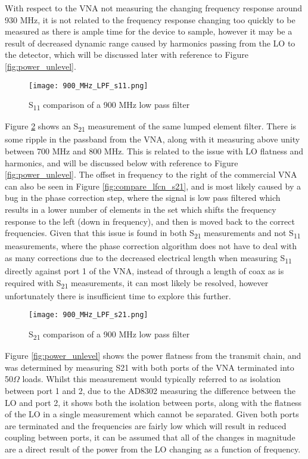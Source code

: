 With respect to the VNA not measuring the changing frequency response around 930 MHz, it is not related to the frequency response changing too quickly to be measured as there is ample time for the device to sample, however it may be a result of decreased dynamic range caused by harmonics passing from the LO to the detector, which will be discussed later with reference to Figure \ref{fig:power_unlevel}. 
\begin{figure}[H]
	\centering
	\texttt{[image: 900\_MHz\_LPF\_s11.png]}
	\caption{S\textsubscript{11} comparison of a 900 MHz low pass filter}
	\label{fig:compare_900_s11}
\end{figure}

Figure \ref{fig:compare_900_s21} shows an S\textsubscript{21} measurement of the same lumped element filter. There is some ripple in the passband from the VNA, along with it measuring above unity between 700 MHz and 800 MHz. This is related to the issue with LO flatness and harmonics, and will be discussed below with reference to Figure \ref{fig:power_unlevel}. The offset in frequency to the right of the commercial VNA can also be seen in Figure \ref{fig:compare_lfcn_s21}, and is most likely caused by a bug in the phase correction step, where the signal is low pass filtered which results in a lower number of elements in the set which shifts the frequency response to the left (down in frequency), and then is moved back to the correct frequencies. Given that this issue is found in both S\textsubscript{21} measurements and not S\textsubscript{11} measurements, where the phase correction algorithm does not have to deal with as many corrections due to the decreased electrical length when measuring S\textsubscript{11} directly against port 1 of the VNA, instead of through a length of coax as is required with S\textsubscript{21} measurements, it can most likely be resolved, however unfortunately there is insufficient time to explore this further. 

\begin{figure}[H]
	\centering
	\texttt{[image: 900\_MHz\_LPF\_s21.png]}
	\caption{S\textsubscript{21} comparison of a 900 MHz low pass filter}
	\label{fig:compare_900_s21}
\end{figure}

Figure \ref{fig:power_unlevel} shows the power flatness from the transmit chain, and was determined by measuring S21 with both ports of the VNA terminated into 50$\Omega$ loads. Whilst this measurement would typically referred to as isolation between port 1 and 2, due to the AD8302 measuring the difference between the LO and port 2, it shows both the isolation between ports, along with the flatness of the LO in a single measurement which cannot be separated. Given both ports are terminated and the frequencies are fairly low which will result in reduced coupling between ports, it can be assumed that all of the changes in magnitude are a direct result of the power from the LO changing as a function of frequency. 

